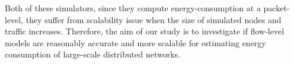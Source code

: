 Both of these simulators, since they compute energy-consumption at a packet-level, they suffer from scalability issue when the size of simulated nodes and traffic increases. Therefore, the aim of our study is to investigate if flow-level models are reasonably accurate and more scalable for estimating energy consumption of large-scale distributed networks.

